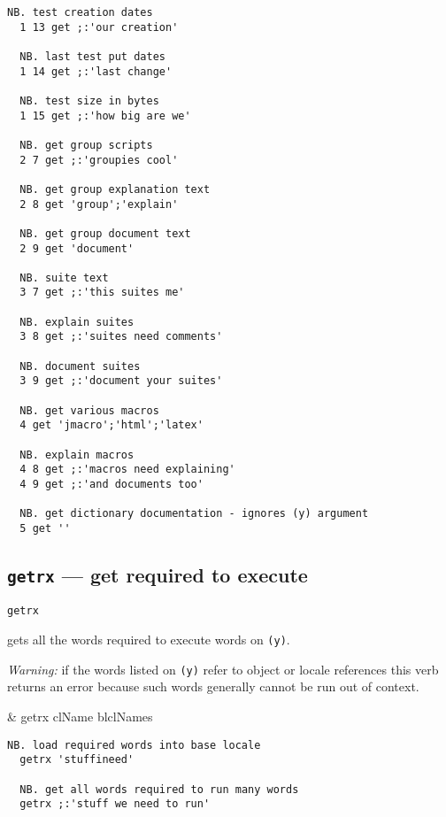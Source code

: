 \begin{lstlisting}[frame=single,framerule=0pt]  
  NB. test creation dates
  1 13 get ;:'our creation'  
  
  NB. last test put dates 
  1 14 get ;:'last change' 
  
  NB. test size in bytes   
  1 15 get ;:'how big are we' 
  
  NB. get group scripts
  2 7 get ;:'groupies cool'  
  
  NB. get group explanation text
  2 8 get 'group';'explain'  
  
  NB. get group document text 
  2 9 get 'document'      
  
  NB. suite text    
  3 7 get ;:'this suites me'    
  
  NB. explain suites    
  3 8 get ;:'suites need comments'  
  
  NB. document suites
  3 9 get ;:'document your suites'  
  
  NB. get various macros
  4 get 'jmacro';'html';'latex'  
  
  NB. explain macros
  4 8 get ;:'macros need explaining'  
  4 9 get ;:'and documents too'
  
  NB. get dictionary documentation - ignores (y) argument
  5 get ''     
\end{lstlisting}


\subsection{\texttt{getrx} ---  get required to execute}\label{ss:getrx}

\hypertarget{il:getrx}{\texttt{getrx}} gets all the words required to execute words on \texttt{(y)}.
 
\emph{Warning:}  if  the words listed on  \texttt{(y)} refer to  object  or 
locale references  this verb  returns  
an error because such words 
generally cannot be run out of context.

\begin{wordhead}
\monad & getrx clName \argsep blclNames \\
\end{wordhead}
\begin{lstlisting}[frame=single,framerule=0pt] 
  NB. load required words into base locale
  getrx 'stuffineed'       

  NB. get all words required to run many words 
  getrx ;:'stuff we need to run' 
\end{lstlisting}

